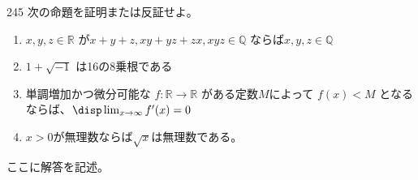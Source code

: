 \begin{prob}{245}{}{}
 次の命題を証明または反証せよ。
 \begin{enumerate}
  \item $x,y,z\in\mathbb{R}$ が$x+y+z,xy+yz+zx,xyz\in\mathbb{Q}$ ならば$x,y,z\in\mathbb{Q}$
  \item $1+\sqrt{-1}$ は16の8乗根である
  \item 単調増加かつ微分可能な $f:\mathbb{R}\rightarrow\mathbb{R}$ がある定数$M$によって $f(x)<M$ となるならば、$\disp \lim_{x\to\infty} f'(x)=0$
  \item $x>0$が無理数ならば$\sqrt{x}$は無理数である。
 \end{enumerate}
\end{prob}
ここに解答を記述。